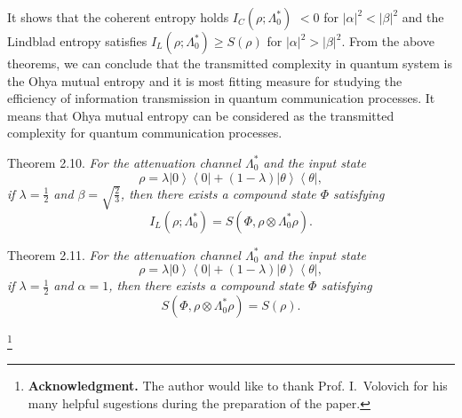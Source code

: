 It shows that the coherent entropy holds  $  I_{C}\left( {\rho ;\Lambda
_{0}^{\ast }}\right)  $    $  <0 $   for  $  \left\vert \alpha \right\vert
^{2}<\left\vert \beta \right\vert ^{2} $   and the Lindblad entropy satisfies  $  %
I_{L}\left( {\rho ;\Lambda _{0}^{\ast }}\right) \geq S( \rho)  $  
for  $  \left\vert \alpha \right\vert ^{2}>\left\vert \beta \right\vert ^{2} $.
From the above theorems, we can conclude that the transmitted complexity in
quantum system is the Ohya mutual entropy and it is most fitting measure for
studying the efficiency of information transmission in quantum communication
processes. It means that Ohya mutual entropy can be considered as the
transmitted complexity for quantum communication processes.

\smallskip

{\small\sc Theorem 2.10.}
{\it 
    For  the  attenuation  channel  $  \Lambda _{0}^{\ast }$  and  the  input
state%
\[
{\rho =\lambda {\left\vert 0\right\rangle }{\left\langle 0\right\vert }%
+(1-\lambda ){\left\vert \theta \right\rangle }{\left\langle \theta
\right\vert },} 
\]
if $  \lambda =\frac{1}{2} $  and $  \beta =\sqrt{\frac{2}{3}} $,  then  there  exists  a
compound  state $  \Phi $  satisfying%
\[
I_{L}{\left( \rho ;\Lambda _{0}^{\ast }\right) =S\left( \Phi, \rho \otimes
\Lambda _{0}^{\ast }\rho \right) \mathrm{.}} 
\]
}

\smallskip

{\small\sc Theorem 2.11.}
{\it 
For  the  attenuation  channel  $  \Lambda _{0}^{\ast } $  and  the  input
state%
\[
{\rho =\lambda {\left\vert 0\right\rangle }{\left\langle 0\right\vert }%
+(1-\lambda ){\left\vert \theta \right\rangle }{\left\langle \theta
\right\vert },} 
\]
if $   \lambda =\frac{1}{2} $  and $   \alpha =1 $,  then  there  exists  a  compound  state $  \Phi $  satisfying%
\[
{S\left( \Phi, \rho \otimes \Lambda _{0}^{\ast }\rho \right) =S\left( \rho
\right).} 
\]
}



\thanks{
\textbf{Acknowledgment.}
The author would like to thank Prof. I.~Volovich for his many helpful
sugestions during the preparation of the paper.
}


